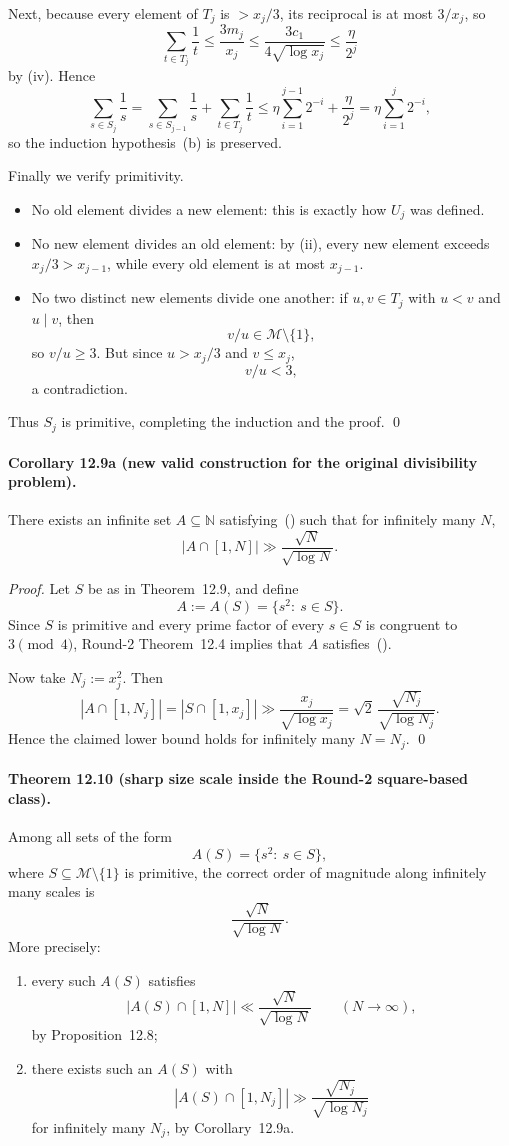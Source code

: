 Next, because every element of $T_j$ is $>x_j/3$, its reciprocal is at most $3/x_j$, so
\[
\sum_{t\in T_j}\frac1t
\le \frac{3m_j}{x_j}
\le \frac{3c_1}{4\sqrt{\log x_j}}
\le \frac{\eta}{2^j}
\]
by (iv). Hence
\[
\sum_{s\in S_j}\frac1s
=
\sum_{s\in S_{j-1}}\frac1s+\sum_{t\in T_j}\frac1t
\le \eta\sum_{i=1}^{j-1}2^{-i}+\frac{\eta}{2^j}
=
\eta\sum_{i=1}^{j}2^{-i},
\]
so the induction hypothesis~(b) is preserved.

Finally we verify primitivity.
\begin{itemize}
\item No old element divides a new element: this is exactly how $U_j$ was defined.
\item No new element divides an old element: by (ii), every new element exceeds $x_j/3>x_{j-1}$, while every old element is at most $x_{j-1}$.
\item No two distinct new elements divide one another: if $u,v\in T_j$ with $u<v$ and $u\mid v$, then
\[
v/u\in \mathcal M\setminus\{1\},
\]
so $v/u\ge 3$. But since $u>x_j/3$ and $v\le x_j$,
\[
v/u<3,
\]
a contradiction.
\end{itemize}
Thus $S_j$ is primitive, completing the induction and the proof.
\qed

\bigskip

\paragraph{\textbf{Corollary 12.9a (new valid construction for the original divisibility problem).}}
There exists an infinite set $A\subseteq \mathbb N$ satisfying~(\*) such that for infinitely many $N$,
\[
|A\cap[1,N]|\gg \frac{\sqrt N}{\sqrt{\log N}}.
\]

\emph{Proof.}
Let $S$ be as in Theorem~12.9, and define
\[
A:=A(S)=\{s^2:\ s\in S\}.
\]
Since $S$ is primitive and every prime factor of every $s\in S$ is congruent to $3\pmod 4$, Round-2 Theorem~12.4 implies that $A$ satisfies~(\*).

Now take $N_j:=x_j^2$. Then
\[
|A\cap[1,N_j]|
=
|S\cap[1,x_j]|
\gg
\frac{x_j}{\sqrt{\log x_j}}
=
\sqrt 2\,\frac{\sqrt{N_j}}{\sqrt{\log N_j}}.
\]
Hence the claimed lower bound holds for infinitely many $N=N_j$.
\qed

\bigskip

\paragraph{\textbf{Theorem 12.10 (sharp size scale inside the Round-2 square-based class).}}
Among all sets of the form
\[
A(S)=\{s^2:\ s\in S\},
\]
where $S\subseteq \mathcal M\setminus\{1\}$ is primitive, the correct order of magnitude along infinitely many scales is
\[
\frac{\sqrt N}{\sqrt{\log N}}.
\]
More precisely:
\begin{enumerate}
\item every such $A(S)$ satisfies
\[
|A(S)\cap[1,N]|\ll \frac{\sqrt N}{\sqrt{\log N}}
\qquad (N\to\infty),
\]
by Proposition~12.8;
\item there exists such an $A(S)$ with
\[
|A(S)\cap[1,N_j]|\gg \frac{\sqrt{N_j}}{\sqrt{\log N_j}}
\]
for infinitely many $N_j$, by Corollary~12.9a.
\end{enumerate}

